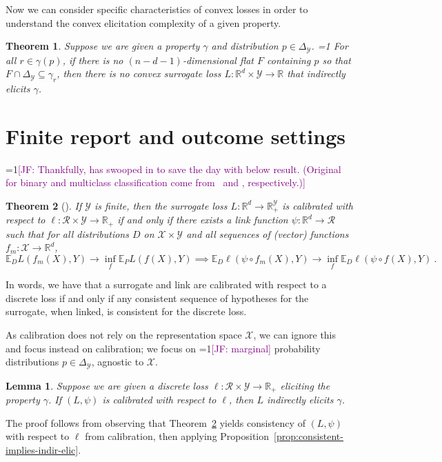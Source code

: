 \documentclass{article}
\newcommand{\Comments}{1}
\newcommand{\mynote}[2]{\ifnum\Comments=1\textcolor{#1}{#2}\fi}
\newcommand{\mytodo}[2]{\ifnum\Comments=1%
	\todo[linecolor=#1!80!black,backgroundcolor=#1,bordercolor=#1!80!black]{#2}\fi}
\newcommand{\raft}[1]{\mytodo{green!20!white}{RF: #1}}
\newcommand{\jessie}[1]{\mynote{purple}{[JF: #1]}}
\newcommand{\reals}{\mathbb{R}}
\newcommand{\simplex}{\Delta_\Y}
\newcommand{\E}{\mathbb{E}}
\newcommand{\R}{\mathcal{R}}
\newcommand{\X}{\mathcal{X}}
\newcommand{\Y}{\mathcal{Y}}
\newtheorem{theorem}{Theorem}
\newtheorem{lemma}{Lemma}
\begin{document}
Now we can consider specific characteristics of convex losses in order to understand the convex elicitation complexity of a given property.

\begin{theorem}\label{thm:cvx-flats}
	Suppose we are given a property $\gamma$ and distribution $p \in \simplex$.
  \raft{Made logic more direct \jessie{Done?}}
	For all $r\in\gamma(p)$, if there is no $(n - d-1)$-dimensional flat $F$ containing $p$ so that $F \cap \simplex \subseteq \gamma_r$, then there is no convex surrogate loss $L : \reals^d \times \Y \to \reals$ that indirectly elicits $\gamma$.
\end{theorem}



\section{Finite report and outcome settings}\label{sec:finite-calib}


\jessie{Thankfully, \cite{ramaswamy2016convex} has swooped in to save the day with below result. (Original for binary and multiclass classification come from~\cite{bartlett2006convexity} and \cite{tewari2007consistency}, respectively.)}

\begin{theorem}[\cite{ramaswamy2016convex}]\label{thm:calib-iff-consistent}
	If $\Y$ is finite, then the surrogate loss $L:\reals^d \to \reals^\Y_+$ is calibrated with respect to $\ell: \R \times \Y \to \reals_+$ if and only if there exists a link function $\psi : \reals^d \to \R$ such that for all distributions $D$ on $\X \times\Y$ and all sequences of (vector) functions $f_m : \X \to \reals^d$,
	\begin{equation*}
	\E_D L(f_m(X), Y) \to \inf_f \E_P L(f(X), Y) \implies \E_D \ell(\psi  \circ f_m(X), Y) \to \inf_f \E_D \ell(\psi \circ f(X), Y)~.~
	\end{equation*}
\end{theorem}
In words, we have that a surrogate and link are calibrated with respect to a discrete loss if and only if any consistent sequence of hypotheses for the surrogate, when linked, is consistent for the discrete loss.

As calibration does not rely on the representation space $\X$, we can ignore this and focus instead on calibration; we focus on \jessie{marginal} probability distributions $p \in \simplex$, agnostic to $\X$.

\begin{lemma}
	Suppose we are given a discrete loss $\ell : \R \times\Y \to \reals_+$ eliciting the property $\gamma$.
	If $(L, \psi)$ is calibrated with respect to $\ell$, then $L$ indirectly elicits $\gamma$.
\end{lemma}
The proof follows from observing that Theorem~\ref{thm:calib-iff-consistent} yields consistency of $(L,\psi)$ with respect to $\ell$ from calibration, then applying Proposition~\ref{prop:consistent-implies-indir-elic}.
\end{document}
